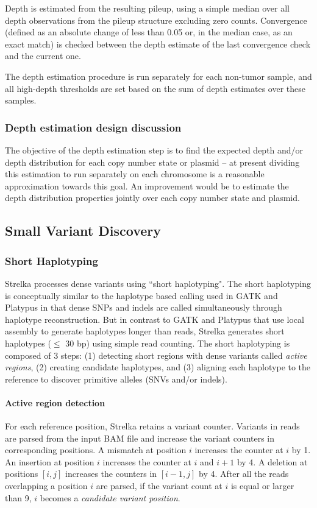 \documentclass{article}
\begin{document}
Depth is estimated from the resulting pileup, using a simple median over all depth observations from the pileup structure excluding zero counts. Convergence (defined as an absolute change of less than 0.05 or, in the median case, as an exact match) is checked between the depth estimate of the last convergence check and the current one.

The depth estimation procedure is run separately for each non-tumor sample, and all high-depth thresholds are set based on the sum of depth estimates over these samples.

\subsubsection{Depth estimation design discussion}

The objective of the depth estimation step is to find the expected depth and/or depth distribution for each copy number state or plasmid -- at present dividing this estimation to run separately on each chromosome is a reasonable approximation towards this goal. An improvement would be to estimate the depth distribution properties jointly over each copy number state and plasmid.

\subsection{Small Variant Discovery}


\subsubsection{Short Haplotyping}

Strelka processes dense variants using ``short haplotyping". The short haplotyping is conceptually similar to the haplotype based calling used in GATK and Platypus in that dense SNPs and indels are called simultaneously through haplotype reconstruction. But in contrast to GATK and Platypus that use local assembly to generate haplotypes longer than reads, Strelka generates short haplotypes ($\leq$ 30 bp) using simple read counting. The short haplotyping is composed of 3 steps: (1) detecting short regions with dense variants called {\em active regions}, (2) creating candidate haplotypes, and (3) aligning each haplotype to the reference to discover primitive alleles (SNVs and/or indels).

\paragraph{Active region detection}
For each reference position, Strelka retains a variant counter. Variants in reads are parsed from the input BAM file and increase the variant counters in corresponding positions. A mismatch at position $i$ increases the counter at $i$ by 1. An insertion at position $i$ increases the counter at $i$ and $i+1$ by 4. A deletion at positions $[i,j]$ increases the counters in $[i-1,j]$ by 4.
After all the reads overlapping a position $i$ are parsed, if the variant count at $i$ is equal or larger than 9, $i$ becomes a {\em candidate variant position}.
\end{document}
